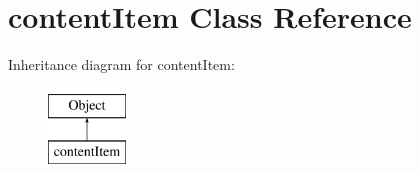 \hypertarget{classcontentItem}{\section{content\-Item Class Reference}
\label{classcontentItem}
}
Inheritance diagram for content\-Item\-:\begin{figure}[H]
\begin{center}
\leavevmode
\includegraphics[height=2.000000cm]{classcontentItem}
\end{center}
\end{figure}
